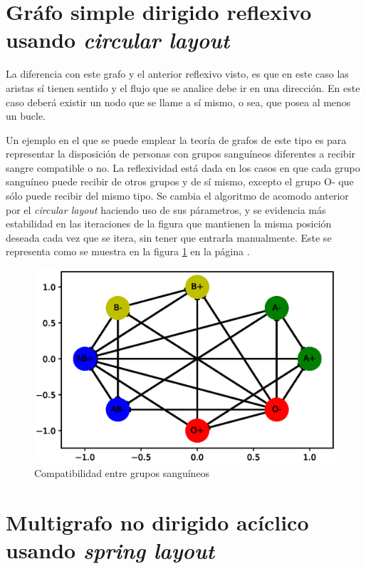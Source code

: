 \documentclass{article}
\begin{document}
\section{Gráfo simple dirigido reflexivo usando \textit{circular layout}}

La diferencia con este grafo y el anterior reflexivo visto, es que en este caso las aristas sí tienen sentido y el flujo que se analice debe ir en una dirección. En este caso deberá existir un nodo que se llame a sí mismo, o sea, que posea al menos un bucle.

Un ejemplo en el que se puede emplear la teoría de grafos de este tipo es para representar la disposición  de personas con grupos sanguíneos diferentes a recibir sangre compatible o no. La reflexividad está dada en los casos en que cada grupo sanguíneo puede recibir de otros grupos y de sí mismo, excepto el grupo O- que sólo puede recibir del mismo tipo. Se cambia el algoritmo de acomodo anterior por el \textit{circular layout} haciendo uso de sus párametros, y se evidencia más estabilidad en las iteraciones de la figura que mantienen la misma posición deseada cada vez que se itera, sin tener que entrarla manualmente.
Este se representa como se muestra en la figura \ref{fig:Fig06} en la página \pageref{fig:Fig06}.

\newpage


\begin{figure}[h]
    \centering
    \includegraphics[scale=0.6]{imagenes1/Fig06.eps}
    \caption{Compatibilidad entre grupos sanguíneos}
    \label{fig:Fig06}
\end{figure}

\section{Multigrafo no dirigido acíclico usando \textit{spring layout}}
\end{document}
